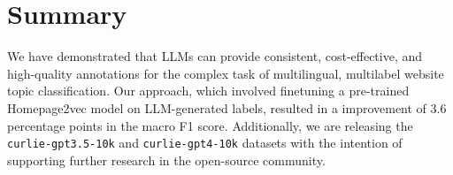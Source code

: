 \section{Summary}\label{sec:summary}

We have demonstrated that LLMs can provide consistent, cost-effective, and high-quality annotations for the complex task of multilingual, multilabel website topic classification. Our approach, which involved finetuning a pre-trained Homepage2vec model on LLM-generated labels, resulted in a improvement of 3.6 percentage points in the macro F1 score. Additionally, we are releasing the \texttt{curlie-gpt3.5-10k} and \texttt{curlie-gpt4-10k} datasets with the intention of supporting further research in the open-source community.